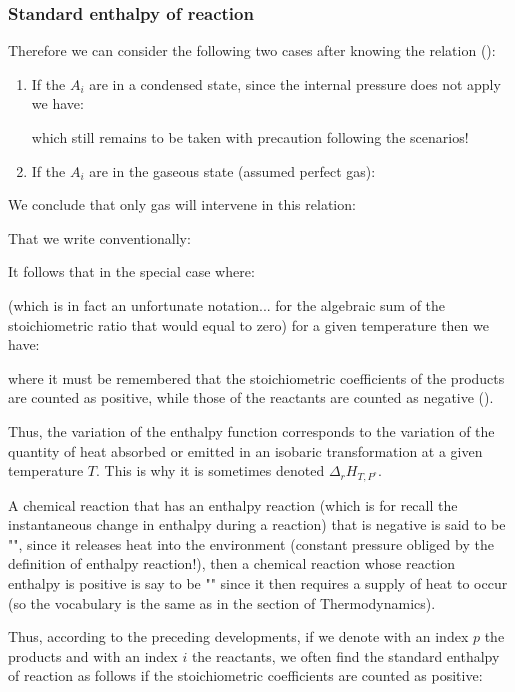 	\subsubsection{Standard enthalpy of reaction}
	Therefore we can consider the following two cases after knowing the relation ():
	
	\begin{enumerate}
		\item If the $A_i$ are in a condensed state, since the internal pressure does not apply we have:
		
		which still remains to be taken with precaution following the scenarios!

		\item If the $A_i$ are in the gaseous state (assumed perfect gas):
		
	\end{enumerate}
	We conclude that only gas will intervene in this relation:
	
	That we write conventionally:
	
	It follows that in the special case where:
	
	(which is in fact an unfortunate notation... for the algebraic sum of the stoichiometric ratio that would equal to zero) for a given temperature then we have:
	
	where it must be remembered that the stoichiometric coefficients of the products are counted as positive, while those of the reactants are counted as negative ().
	
	Thus, the variation of the enthalpy function corresponds to the variation of the quantity of heat absorbed or emitted in an isobaric transformation at a given temperature $T$. This is why it is sometimes denoted $\Delta_r H_{T,P^\circ}$.

	A chemical reaction that has an enthalpy reaction (which is for recall the instantaneous change in enthalpy during a reaction) that is negative is said to be "", since it releases heat into the environment (constant pressure obliged by the definition of enthalpy reaction!), then a chemical reaction whose reaction enthalpy is positive is say to be "" since it then requires a supply of heat to occur (so the vocabulary is the same as in the section of Thermodynamics).

	Thus, according to the preceding developments, if we denote with an index $p$ the products and with an index $i$ the reactants, we often find the standard enthalpy of reaction as follows if the stoichiometric coefficients are counted as positive:
	
